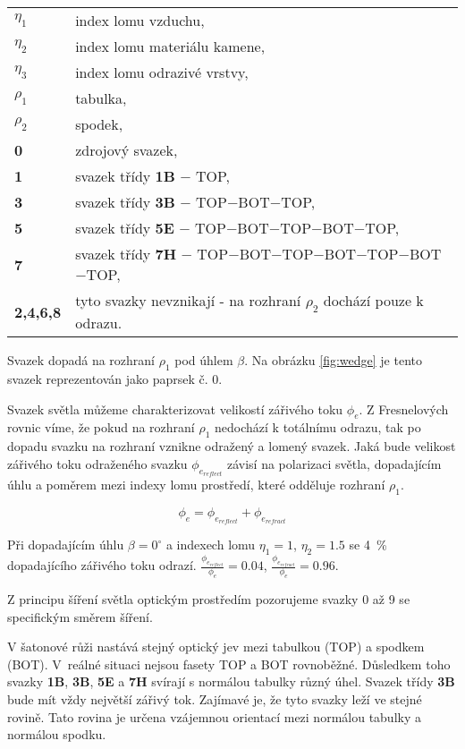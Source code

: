 \begin{tabular}{p{2cm} l}
$\eta_1$ & index lomu vzduchu,\\
$\eta_2$ & index lomu materiálu kamene,\\
$\eta_3$ & index lomu odrazivé vrstvy,\\
$\rho_1$ & tabulka,\\
$\rho_2$ & spodek,\\
\textbf{0} & zdrojový svazek,\\
\textbf{1} & svazek třídy \textbf{1B} $-$ TOP,\\
\textbf{3} & svazek třídy \textbf{3B} $-$ TOP$-$BOT$-$TOP,\\
\textbf{5} & svazek třídy \textbf{5E} $-$ TOP$-$BOT$-$TOP$-$BOT$-$TOP,\\
\textbf{7} & svazek třídy \textbf{7H} $-$ TOP$-$BOT$-$TOP$-$BOT$-$TOP$-$BOT$-$TOP,\\
\textbf{2,4,6,8} & tyto svazky nevznikají - na rozhraní $\rho_2$ dochází pouze k odrazu.\\
\end{tabular}
\vspace{2mm}

Svazek dopadá na rozhraní $\rho_1$ pod úhlem $\beta$. Na obrázku \ref{fig:wedge} je tento svazek reprezentován jako paprsek č. 0. 

Svazek světla můžeme charakterizovat velikostí zářivého toku $\phi_e$. Z Fresnelových rovnic \cite{Handbook} víme, že pokud na rozhraní $\rho_1$ nedochází k totálnímu odrazu, tak po dopadu svazku na rozhraní vznikne odražený a lomený svazek. Jaká bude velikost zářivého toku odraženého svazku $\phi_{e_{reflect}}$ závisí na polarizaci světla, dopadajícím úhlu a poměrem mezi indexy lomu prostředí, které odděluje rozhraní $\rho_1$.

\begin{equation}
\phi_e = \phi_{e_{reflect}} + \phi_{e_{refract}}
\end{equation}

 Při dopadajícím úhlu $\beta = 0^\circ$ a indexech lomu $\eta_1 = 1$, $\eta_2 = 1.5$ se \SI{4}{\percent} dopadajícího zářivého toku odrazí. $\frac{\phi_{e_{reflect}}}{\phi_e} = 0.04$, $\frac{\phi_{e_{refract}}}{\phi_e} = 0.96$.

Z principu šíření světla optickým prostředím pozorujeme svazky 0 až 9 se specifickým směrem šíření. 

V šatonové růži nastává stejný optický jev mezi tabulkou (TOP) a spodkem (BOT). V~reálné situaci nejsou fasety TOP a BOT rovnoběžné. Důsledkem toho svazky \textbf{1B}, \textbf{3B}, \textbf{5E} a \textbf{7H} svírají s normálou tabulky různý úhel. Svazek třídy \textbf{3B} bude mít vždy největší zářivý tok. Zajímavé je, že tyto svazky leží ve stejné rovině. Tato rovina je určena vzájemnou orientací mezi normálou tabulky a normálou spodku.


